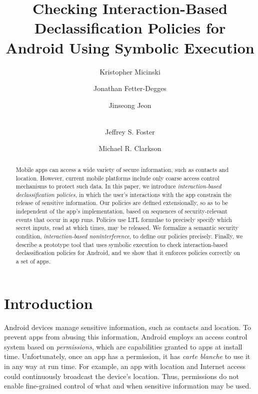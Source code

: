 \documentclass{llncs}
\begin{document}
\title{Checking Interaction-Based
  Declassification Policies for Android Using Symbolic Execution}

\author{Kristopher Micinski \and
  Jonathan Fetter-Degges \and
  Jinseong Jeon \and \\
  Jeffrey S. Foster \and
  Michael R. Clarkson}

\maketitle

\begin{abstract} 
  Mobile apps can access a wide variety of secure information, such as
  contacts and location. However, current mobile platforms include
  only coarse access control mechanisms to protect such data.  In this
  paper, we introduce \emph{interaction-based declassification
    policies}, in which the user's interactions with the app constrain
  the release of sensitive information.  Our policies are defined
  extensionally, so as to be independent of the app's implementation,
  based on sequences of security-relevant events that occur in app
  runs. Policies use LTL formulae to precisely specify which secret
  inputs, read at which times, may be released. We formalize a
  semantic security condition, \emph{interaction-based
    noninterference}, to define our policies precisely.  Finally, we
  describe a prototype tool that uses symbolic execution to check
  interaction-based declassification policies for Android, and we show
  that it enforces policies correctly on a set of apps.
\end{abstract}

\section{Introduction}
\label{sec:introduction}

Android devices manage sensitive information, such as contacts and
location.  To prevent apps from abusing this information, Android
employs an access control system based on \emph{permissions}, which
are capabilities granted to apps at install time. Unfortunately, once
an app has a permission, it has \emph{carte blanche} to use it in any
way at run time. For example, an app with location and Internet access
could continuously broadcast the device's location.
Thus, permissions do not enable fine-grained control of what and when
sensitive information may be used.
\end{document}

